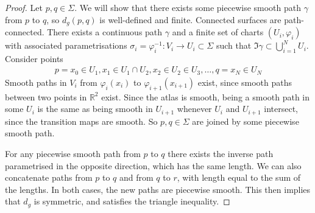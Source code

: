 \begin{proof}
	Let $p, q \in \Sigma$.
	We will show that there exists some piecewise smooth path $\gamma$ from $p$ to $q$, so $d_g(p,q)$ is well-defined and finite.
	Connected surfaces are path-connected.
	There exists a continuous path $\gamma$ and a finite set of charts $(U_i, \varphi_i)$ with associated parametrisations $\sigma_i = \varphi_i^{-1} \colon V_i \to U_i \subset \Sigma$ such that $\Im \gamma \subset \bigcup_{i=1}^N U_i$.
	Consider points
	\begin{align*}
		p = x_0 \in U_1, x_1 \in U_1 \cap U_2, x_2 \in U_2 \in U_3, \dots, q = x_N \in U_N
	\end{align*}
	Smooth paths in $V_i$ from $\varphi_i(x_i)$ to $\varphi_{i+1}(x_{i+1})$ exist, since smooth paths between two points in $\mathbb R^2$ exist.
	Since the atlas is smooth, being a smooth path in some $U_i$ is the same as being smooth in $U_{i+1}$ whenever $U_i$ and $U_{i+1}$ intersect, since the transition maps are smooth.
	So $p,q \in \Sigma$ are joined by some piecewise smooth path.

	For any piecewise smooth path from $p$ to $q$ there exists the inverse path parametrised in the opposite direction, which has the same length.
	We can also concatenate paths from $p$ to $q$ and from $q$ to $r$, with length equal to the sum of the lengths.
	In both cases, the new paths are piecewise smooth.
	This then implies that $d_g$ is symmetric, and satisfies the triangle inequality.


\end{proof}
